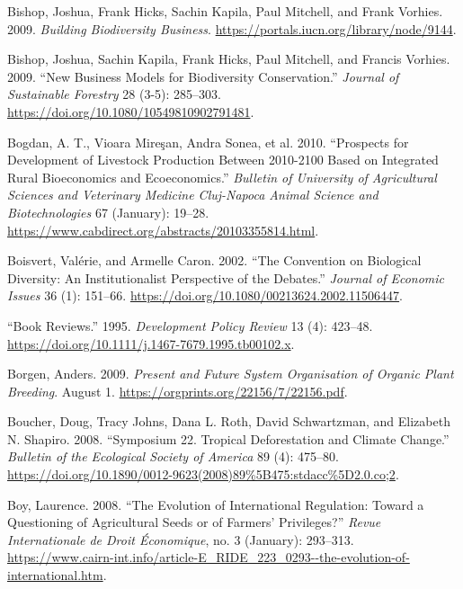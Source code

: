 \begin{CSLReferences}{1}{1}
Bishop, Joshua, Frank Hicks, Sachin Kapila, Paul Mitchell, and Frank
Vorhies. 2009. \emph{Building Biodiversity Business}.
\url{https://portals.iucn.org/library/node/9144}.

Bishop, Joshua, Sachin Kapila, Frank Hicks, Paul Mitchell, and Francis
Vorhies. 2009. {``New Business Models for Biodiversity Conservation.''}
\emph{Journal of Sustainable Forestry} 28 (3-5): 285--303.
\url{https://doi.org/10.1080/10549810902791481}.

Bogdan, A. T., Vioara Mireşan, Andra Sonea, et al. 2010. {``Prospects
for Development of Livestock Production Between 2010-2100 Based on
Integrated Rural Bioeconomics and Ecoeconomics.''} \emph{Bulletin of
University of Agricultural Sciences and Veterinary Medicine Cluj-Napoca
Animal Science and Biotechnologies} 67 (January): 19--28.
\url{https://www.cabdirect.org/abstracts/20103355814.html}.

Boisvert, Valérie, and Armelle Caron. 2002. {``The Convention on
Biological Diversity: An Institutionalist Perspective of the Debates.''}
\emph{Journal of Economic Issues} 36 (1): 151--66.
\url{https://doi.org/10.1080/00213624.2002.11506447}.

{``Book Reviews.''} 1995. \emph{Development Policy Review} 13 (4):
423--48. \url{https://doi.org/10.1111/j.1467-7679.1995.tb00102.x}.

Borgen, Anders. 2009. \emph{Present and Future System Organisation of
Organic Plant Breeding}. August 1.
\url{https://orgprints.org/22156/7/22156.pdf}.

Boucher, Doug, Tracy Johns, Dana L. Roth, David Schwartzman, and
Elizabeth N. Shapiro. 2008. {``Symposium 22. Tropical Deforestation and
Climate Change.''} \emph{Bulletin of the Ecological Society of America}
89 (4): 475--80.
\url{https://doi.org/10.1890/0012-9623(2008)89\%5B475:stdacc\%5D2.0.co;2}.

Boy, Laurence. 2008. {``The Evolution of International Regulation:
Toward a Questioning of Agricultural Seeds or of Farmers' Privileges?''}
\emph{Revue Internationale de Droit Économique}, no. 3 (January):
293--313.
\url{https://www.cairn-int.info/article-E_RIDE_223_0293--the-evolution-of-international.htm}.


\end{CSLReferences}
